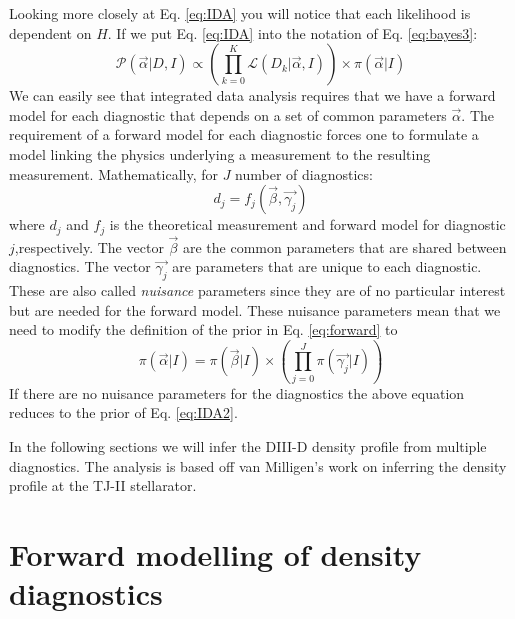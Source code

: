\documentclass[12pt]{article}
\numberwithin{equation}{section}
\begin{document}
Looking more closely at Eq. \ref{eq:IDA} you will notice that each likelihood is dependent on $H$. 
If we put Eq. \ref{eq:IDA} into the notation of Eq. \ref{eq:bayes3}:
\begin{equation} \label{eq:IDA2}
	  {\mathcal{P}(\vec{\alpha}|D,I)} \propto {\left( \prod\limits_{k=0}^K{\mathcal{L}(D_k|\vec{\alpha},I)} \right)} \times 
	  {\pi(\vec{\alpha}|I)}
\end{equation}
We can easily see that integrated data analysis requires that we have a forward model for each diagnostic that depends on 
a set of common parameters $\vec{\alpha}$. 
The requirement of a forward model for each diagnostic forces one to formulate a model linking the physics underlying a measurement to 
the resulting measurement. Mathematically, for $J$ number of diagnostics:
\begin{equation} \label{eq:forward}
	d_j = f_j(\vec{\beta},\vec{\gamma_j})
\end{equation}
where $d_j$ and $f_j$ is the theoretical measurement and forward model for diagnostic $j$,respectively. The vector $\vec{\beta}$ are the common parameters that are shared between diagnostics. The vector $\vec{\gamma_j}$ are parameters that are unique to each diagnostic. These are also called \emph{nuisance} parameters since they are of no particular interest but are needed for the forward model. These nuisance parameters mean that we need to modify the definition of the prior in Eq. \ref{eq:forward} to 
\begin{equation} \label{eq:forwardprior}
	\pi ( \vec{\alpha} | I ) = \pi ( \vec{\beta}|I) \times \left( \prod \limits_{j=0}^{J} \pi ( \vec{\gamma_j}|I) \right)
\end{equation}
If there are no nuisance parameters for the diagnostics the above equation reduces to the prior of Eq. \ref{eq:IDA2}.

In the following sections we will infer the DIII-D density profile 
from multiple diagnostics. The analysis is based off van Milligen's 
work on inferring the density profile at the TJ-II stellarator.\cite
{van2011integrated} 
\section{Forward modelling of density diagnostics}
\end{document}
